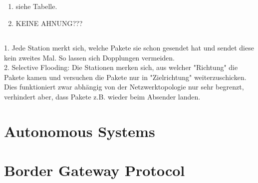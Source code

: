 \documentclass[a4paper,
			llpt,
			solution,
			accentcolor=tud2d,
			colorbacktitle
			]
			{tudexercise}
\newcommand{\MiBs}{\mathrm{MiB}/\mathrm{s}}
\newcommand{\8}{$\infty$}
\begin{document}
\subsection{}
\begin{enumerate}

\item siehe Tabelle.


\item KEINE AHNUNG???

\end{enumerate}
\subsection{}
      1. Jede Station merkt sich, welche Pakete sie schon gesendet hat und sendet diese kein zweites Mal. So lassen sich Dopplungen vermeiden.\\
      2. Selective Flooding: Die Stationen merken sich, aus welcher "Richtung" die Pakete kamen und versuchen die Pakete nur in "Zielrichtung" weiterzuschicken. Dies funktioniert zwar abhängig von der Netzwerktopologie nur sehr begrenzt, verhindert aber, dass Pakete z.B. wieder beim Absender landen.
\section{Autonomous Systems}
\section{Border Gateway Protocol}
\end{document}
